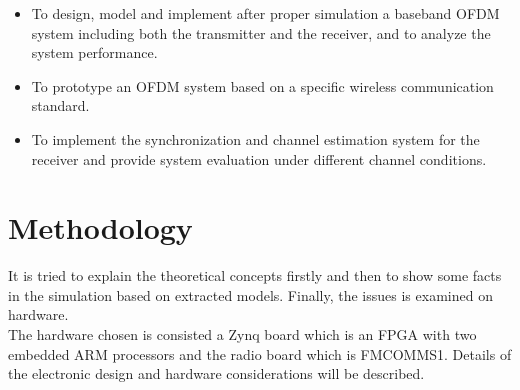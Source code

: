 \begin{itemize}
\item To design, model and implement after proper simulation a baseband OFDM system including both the transmitter and the receiver, and to analyze the system performance.
\item To prototype an OFDM system based on a specific wireless communication standard.
\item To implement the synchronization and channel estimation system for the receiver and provide system evaluation under different channel conditions.
\end{itemize}


\section{Methodology}
It is tried to explain the theoretical concepts firstly and then to show some facts in the simulation based on extracted models. Finally, the issues is examined on hardware.\\
The hardware chosen is consisted a Zynq board which is an FPGA with two embedded ARM processors and the radio board which is FMCOMMS1. Details of the electronic design and hardware considerations will be described.